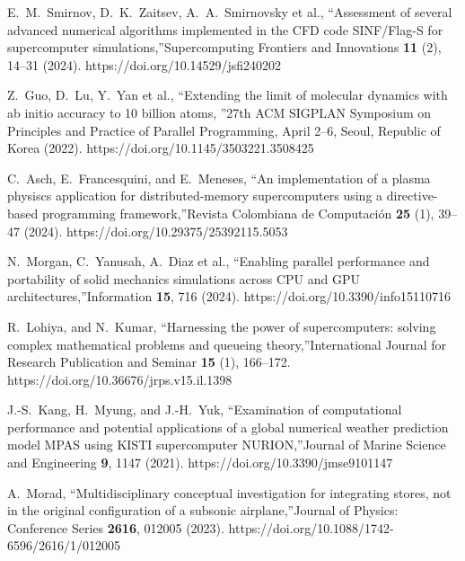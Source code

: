 \documentclass[
11pt,%
tightenlines,%
twoside,%
onecolumn,%
nofloats,%
nobibnotes,%
nofootinbib,%
superscriptaddress,%
noshowpacs,%
centertags]%
{revtex4}
\begin{document}
\begin{thebibliography}{99}

E.~M.~Smirnov, D.~K.~Zaitsev, A.~A.~Smirnovsky et al., \textquotedblleft Assessment of several advanced numerical algorithms implemented in the CFD code SINF/Flag-S for supercomputer simulations,\textquotedblright Supercomputing Frontiers and Innovations \textbf{11} (2), 14--31 (2024). https://doi.org/10.14529/jsfi240202

Z.~Guo, D.~Lu, Y.~Yan et al., \textquotedblleft Extending the limit of molecular dynamics with ab initio accuracy to 10 billion atoms, \textquotedblright 27th ACM SIGPLAN Symposium on Principles and Practice of Parallel Programming, April 2--6, Seoul, Republic of Korea (2022). https://doi.org/10.1145/3503221.3508425

C.~Asch, E.~Francesquini, and E.~Meneses, \textquotedblleft An implementation of a plasma physiscs application for distributed-memory supercomputers using a directive-based programming framework,\textquotedblright Revista Colombiana de Computaci\'on \textbf{25} (1), 39--47 (2024). https://doi.org/10.29375/25392115.5053

N.~Morgan, C.~Yanusah, A.~Diaz et al., \textquotedblleft Enabling parallel performance and portability of solid mechanics simulations across CPU and GPU architectures,\textquotedblright Information \textbf{15}, 716 (2024). https://doi.org/10.3390/info15110716

R.~Lohiya, and N.~Kumar, \textquotedblleft Harnessing the power of supercomputers: solving complex mathematical problems and queueing theory,\textquotedblright International Journal for Research Publication and Seminar \textbf{15} (1), 166--172. https://doi.org/10.36676/jrps.v15.il.1398

J.-S.~Kang, H.~Myung, and J.-H.~Yuk, \textquotedblleft Examination of computational performance and potential applications of a global numerical weather prediction model MPAS using KISTI supercomputer NURION,\textquotedblright Journal of Marine Science and Engineering \textbf{9}, 1147 (2021). https://doi.org/10.3390/jmse9101147

A.~Morad, \textquotedblleft Multidisciplinary conceptual investigation for integrating stores, not in the original configuration of a subsonic airplane,\textquotedblright Journal of Physics: Conference Series \textbf{2616}, 012005 (2023). https://doi.org/10.1088/1742-6596/2616/1/012005


\end{thebibliography}
\end{document}
